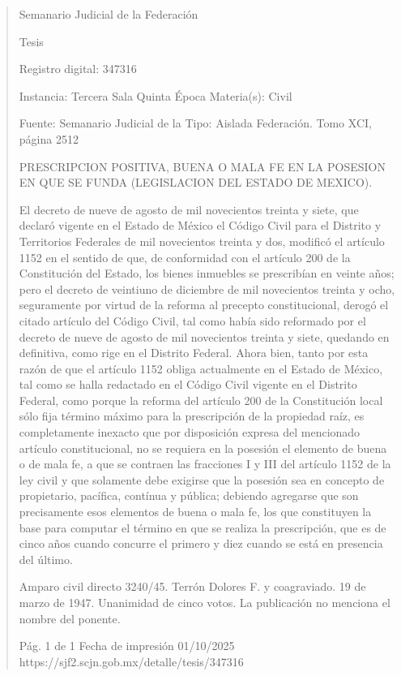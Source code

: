 \documentclass[11pt,a4paper]{article}
\begin{document}
\begin{quote}
                                                   Semanario Judicial de la Federación

                                                  Tesis

 Registro digital: 347316

 Instancia: Tercera Sala          Quinta Época                          Materia(s): Civil

                                  Fuente: Semanario Judicial de la      Tipo: Aislada
                                  Federación.
                                  Tomo XCI, página 2512


PRESCRIPCION POSITIVA, BUENA O MALA FE EN LA POSESION EN QUE SE FUNDA
(LEGISLACION DEL ESTADO DE MEXICO).


El decreto de nueve de agosto de mil novecientos treinta y siete, que declaró vigente en el Estado
de México el Código Civil para el Distrito y Territorios Federales de mil novecientos treinta y dos,
modificó el artículo 1152 en el sentido de que, de conformidad con el artículo 200 de la Constitución
del Estado, los bienes inmuebles se prescribían en veinte años; pero el decreto de veintiuno de
diciembre de mil novecientos treinta y ocho, seguramente por virtud de la reforma al precepto
constitucional, derogó el citado artículo del Código Civil, tal como había sido reformado por el
decreto de nueve de agosto de mil novecientos treinta y siete, quedando en definitiva, como rige en
el Distrito Federal. Ahora bien, tanto por esta razón de que el artículo 1152 obliga actualmente en el
Estado de México, tal como se halla redactado en el Código Civil vigente en el Distrito Federal,
como porque la reforma del artículo 200 de la Constitución local sólo fija término máximo para la
prescripción de la propiedad raíz, es completamente inexacto que por disposición expresa del
mencionado artículo constitucional, no se requiera en la posesión el elemento de buena o de mala
fe, a que se contraen las fracciones I y III del artículo 1152 de la ley civil y que solamente debe
exigirse que la posesión sea en concepto de propietario, pacífica, contínua y pública; debiendo
agregarse que son precisamente esos elementos de buena o mala fe, los que constituyen la base
para computar el término en que se realiza la prescripción, que es de cinco años cuando concurre el
primero y diez cuando se está en presencia del último.


Amparo civil directo 3240/45. Terrón Dolores F. y coagraviado. 19 de marzo de 1947. Unanimidad
de cinco votos. La publicación no menciona el nombre del ponente.




                                             Pág. 1 de 1             Fecha de impresión 01/10/2025
  https://sjf2.scjn.gob.mx/detalle/tesis/347316

\end{quote}
\end{document}
